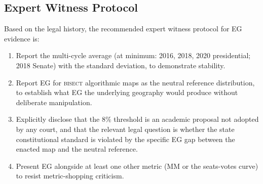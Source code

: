 \subsection{Expert Witness Protocol}

Based on the legal history, the recommended expert witness protocol for EG evidence is:

\begin{enumerate}
\item Report the multi-cycle average (at minimum: 2016, 2018, 2020 presidential;
  2018 Senate) with the standard deviation, to demonstrate stability.
\item Report EG for \textsc{bisect} algorithmic maps as the neutral reference
  distribution, to establish what EG the underlying geography would produce
  without deliberate manipulation.
\item Explicitly disclose that the 8\% threshold is an academic proposal not
  adopted by any court, and that the relevant legal question is whether the
  state constitutional standard is violated by the specific EG gap between
  the enacted map and the neutral reference.
\item Present EG alongside at least one other metric (MM or the seats-votes curve)
  to resist metric-shopping criticism.
\end{enumerate}
